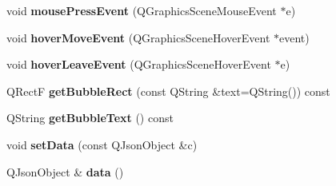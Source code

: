 \begin{DoxyCompactItemize}
\item 
\hypertarget{class_arrow_item_adc9564f934342f76ebf4fe85d62fdd4a}{void {\bfseries mouse\-Press\-Event} (Q\-Graphics\-Scene\-Mouse\-Event $\ast$e)}\label{class_arrow_item_adc9564f934342f76ebf4fe85d62fdd4a}

\item 
\hypertarget{class_arrow_item_aac5e6a85ce4e7c55db1d6fa766bfdcbe}{void {\bfseries hover\-Move\-Event} (Q\-Graphics\-Scene\-Hover\-Event $\ast$event)}\label{class_arrow_item_aac5e6a85ce4e7c55db1d6fa766bfdcbe}

\item 
\hypertarget{class_arrow_item_a40be3bbaa6058570295960fbf9c48b5f}{void {\bfseries hover\-Leave\-Event} (Q\-Graphics\-Scene\-Hover\-Event $\ast$e)}\label{class_arrow_item_a40be3bbaa6058570295960fbf9c48b5f}

\item 
\hypertarget{class_arrow_item_a3df03f7be6027fce5e44f04518c484e2}{Q\-Rect\-F {\bfseries get\-Bubble\-Rect} (const Q\-String \&text=Q\-String()) const }\label{class_arrow_item_a3df03f7be6027fce5e44f04518c484e2}

\item 
\hypertarget{class_arrow_item_a4330bbefab55e801589d93f30a2f127c}{Q\-String {\bfseries get\-Bubble\-Text} () const }\label{class_arrow_item_a4330bbefab55e801589d93f30a2f127c}

\item 
\hypertarget{class_arrow_item_aca2a23affcb35ff42299ce8afc453931}{void {\bfseries set\-Data} (const Q\-Json\-Object \&c)}\label{class_arrow_item_aca2a23affcb35ff42299ce8afc453931}

\item 
\hypertarget{class_arrow_item_a4d6c86b4c5376b3e0586fd7ef320d81c}{Q\-Json\-Object \& {\bfseries data} ()}\label{class_arrow_item_a4d6c86b4c5376b3e0586fd7ef320d81c}

\end{DoxyCompactItemize}
